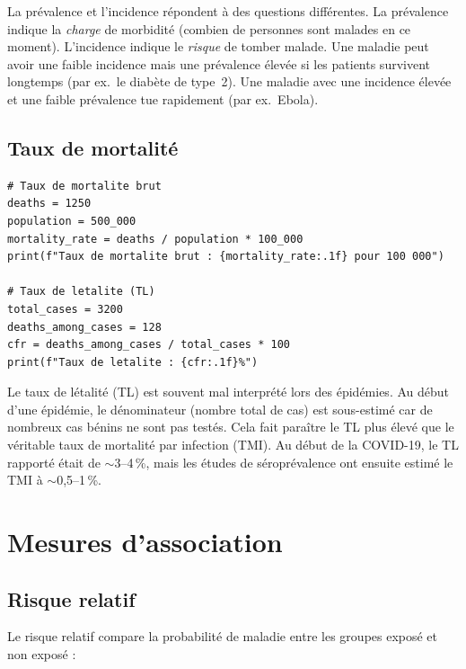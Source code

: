 \begin{warningbox}
La pr\'evalence et l'incidence r\'epondent \`a des questions diff\'erentes. La pr\'evalence indique la \emph{charge} de morbidité (combien de personnes sont malades en ce moment). L'incidence indique le \emph{risque} de tomber malade. Une maladie peut avoir une faible incidence mais une pr\'evalence \'elev\'ee si les patients survivent longtemps (par ex.\ le diab\`ete de type~2). Une maladie avec une incidence \'elev\'ee et une faible pr\'evalence tue rapidement (par ex.\ Ebola).
\end{warningbox}

\subsection{Taux de mortalit\'e}

\begin{verbatim}
# Taux de mortalite brut
deaths = 1250
population = 500_000
mortality_rate = deaths / population * 100_000
print(f"Taux de mortalite brut : {mortality_rate:.1f} pour 100 000")

# Taux de letalite (TL)
total_cases = 3200
deaths_among_cases = 128
cfr = deaths_among_cases / total_cases * 100
print(f"Taux de letalite : {cfr:.1f}%")
\end{verbatim}

\begin{clinicalnote}
Le taux de l\'etalit\'e (TL) est souvent mal interpr\'et\'e lors des \'epid\'emies. Au d\'ebut d'une \'epid\'emie, le d\'enominateur (nombre total de cas) est sous-estim\'e car de nombreux cas b\'enins ne sont pas test\'es. Cela fait para\^itre le TL plus \'elev\'e que le v\'eritable taux de mortalit\'e par infection (TMI). Au d\'ebut de la COVID-19, le TL rapport\'e \'etait de $\sim$3--4\,\%, mais les \'etudes de s\'eropr\'evalence ont ensuite estim\'e le TMI \`a $\sim$0,5--1\,\%.
\end{clinicalnote}

\section{Mesures d'association}

\subsection{Risque relatif}

Le risque relatif compare la probabilit\'e de maladie entre les groupes expos\'e et non expos\'e :

